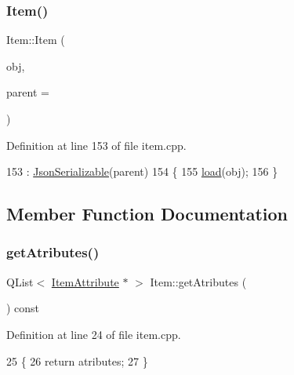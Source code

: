 \subsubsection{\texorpdfstring{Item()}{Item()}\hspace{0.1cm}{\footnotesize\ttfamily [2/2]}}
{\footnotesize\ttfamily Item\+::\+Item (\begin{DoxyParamCaption}\item[{Q\+Json\+Object}]{obj,  }\item[{Q\+Object $\ast$}]{parent = {} }\end{DoxyParamCaption})}



Definition at line 153 of file item.\+cpp.


\begin{DoxyCode}
153                                           : \hyperlink{class_json_serializable_ab5bc08152c95bca5aad8f1a4e2c09998}{JsonSerializable}(parent)
154 \{
155     \hyperlink{class_item_aa089e9749b9a19492d45bb02c2135b48}{load}(obj);
156 \}
\end{DoxyCode}


\subsection{Member Function Documentation}
\mbox{\label{class_item_ad954d16c20b7f88ceaf67d584a025070}} 
\subsubsection{\texorpdfstring{get\+Atributes()}{getAtributes()}}
{\footnotesize\ttfamily Q\+List$<$ \hyperlink{class_item_attribute}{Item\+Attribute} $\ast$ $>$ Item\+::get\+Atributes (\begin{DoxyParamCaption}{ }\end{DoxyParamCaption}) const}



Definition at line 24 of file item.\+cpp.


\begin{DoxyCode}
25 \{
26     \textcolor{keywordflow}{return} atributes;
27 \}
\end{DoxyCode}
\mbox{\label{class_item_a9b13c14f5684cf1bf9a085718bf5bb27}} 
